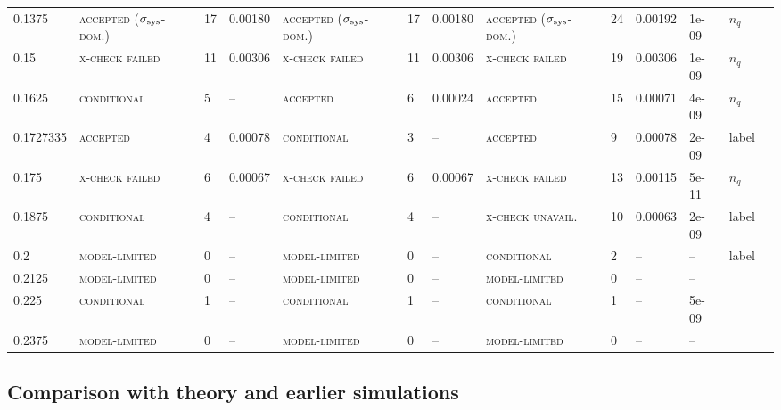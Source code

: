 \documentclass[10pt,a4paper]{article}
\newcommand{\lbl}[1]{{\mdseries\scshape #1}}
\begin{document}
\begin{table}[htbp]
\begin{tabular}{@{}lllllllllllll@{}}
0.1375 & \lbl{accepted ($\sigma_{\rm sys}$-dom.)} & 17 & 0.00180 & \lbl{accepted ($\sigma_{\rm sys}$-dom.)} & 17 & 0.00180 & \lbl{accepted ($\sigma_{\rm sys}$-dom.)} & 24 & 0.00192 & 1e-09 & $n_q$ \\
0.15 & \lbl{x-check failed} & 11 & 0.00306 & \lbl{x-check failed} & 11 & 0.00306 & \lbl{x-check failed} & 19 & 0.00306 & 1e-09 & $n_q$ \\
0.1625 & \lbl{conditional} & 5 & -- & \lbl{accepted} & 6 & 0.00024 & \lbl{accepted} & 15 & 0.00071 & 4e-09 & $n_q$ \\
0.1727335 & \lbl{accepted} & 4 & 0.00078 & \lbl{conditional} & 3 & -- & \lbl{accepted} & 9 & 0.00078 & 2e-09 & label \\
0.175 & \lbl{x-check failed} & 6 & 0.00067 & \lbl{x-check failed} & 6 & 0.00067 & \lbl{x-check failed} & 13 & 0.00115 & 5e-11 & $n_q$ \\
0.1875 & \lbl{conditional} & 4 & -- & \lbl{conditional} & 4 & -- & \lbl{x-check unavail.} & 10 & 0.00063 & 2e-09 & label \\
0.2 & \lbl{model-limited} & 0 & -- & \lbl{model-limited} & 0 & -- & \lbl{conditional} & 2 & -- & -- & label \\
0.2125 & \lbl{model-limited} & 0 & -- & \lbl{model-limited} & 0 & -- & \lbl{model-limited} & 0 & -- & -- &  \\
0.225 & \lbl{conditional} & 1 & -- & \lbl{conditional} & 1 & -- & \lbl{conditional} & 1 & -- & 5e-09 &  \\
0.2375 & \lbl{model-limited} & 0 & -- & \lbl{model-limited} & 0 & -- & \lbl{model-limited} & 0 & -- & -- &  \\
\bottomrule\end{tabular}
\end{table}

\subsection{Comparison with theory and earlier simulations}\label{sec:theory1d}
\end{document}
